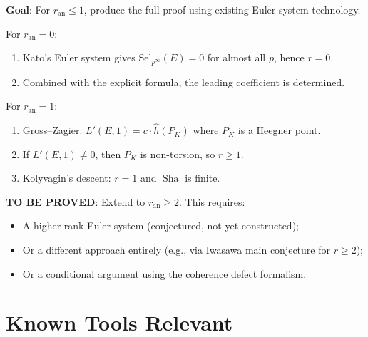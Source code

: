 \documentclass[11pt]{article}
\theoremstyle{definition}
\DeclareMathOperator{\Sha}{Sha}
\begin{document}
\textbf{Goal}: For $r_{\mathrm{an}} \leq 1$, produce the full proof using existing
Euler system technology.

For $r_{\mathrm{an}} = 0$:
\begin{enumerate}
  \item Kato's Euler system \cite{Kato} gives $\mathrm{Sel}_{p^\infty}(E) = 0$
    for almost all $p$, hence $r = 0$.
  \item Combined with the explicit formula, the leading coefficient is determined.
\end{enumerate}

For $r_{\mathrm{an}} = 1$:
\begin{enumerate}
  \item Gross--Zagier: $L'(E,1) = c \cdot \hat{h}(P_K)$ where $P_K$ is a Heegner point.
  \item If $L'(E,1) \neq 0$, then $P_K$ is non-torsion, so $r \geq 1$.
  \item Kolyvagin's descent: $r = 1$ and $\Sha$ is finite.
\end{enumerate}

\textbf{TO BE PROVED}: Extend to $r_{\mathrm{an}} \geq 2$.  This requires:
\begin{itemize}
  \item A higher-rank Euler system (conjectured, not yet constructed);
  \item Or a different approach entirely (e.g., via Iwasawa main conjecture for $r \geq 2$);
  \item Or a conditional argument using the coherence defect formalism.
\end{itemize}

\section{Known Tools Relevant}
\end{document}
